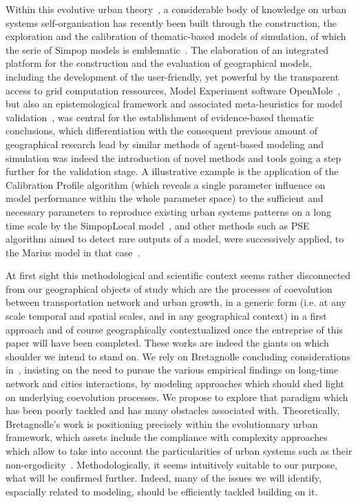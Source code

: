 

Within this evolutive urban theory~\cite{pumain2006evolutionary}, a considerable body of knowledge on urban systems self-organisation has recently been built through the construction, the exploration and the calibration of thematic-based models of simulation, of which the serie of Simpop models is emblematic~\cite{pumain2012multi}. The elaboration of an integrated platform for the construction and the evaluation of geographical models, including the development of the user-friendly, yet powerful by the transparent access to grid computation ressources, Model Experiment software OpenMole~\cite{reuillon2013openmole}, but also an epistemological framework and associated meta-heuristics for model validation~\cite{rey2015plateforme}, was central for the establishment of evidence-based thematic conclusions, which differentiation with the consequent previous amount of geographical research lead by similar methods of agent-based modeling and simulation was indeed the introduction of novel methods and tools going a step further for the validation stage. A illustrative example is the application of the Calibration Profile algorithm (which reveals a single parameter influence on model performance within the whole parameter space) to the sufficient and necessary parameters to reproduce existing urban systems patterns on a long time scale by the SimpopLocal model~\cite{schmitt2014half}, and other methods such as PSE algorithm aimed to detect rare outputs of a model, were successively applied, to the Marius model in that case~\cite{10.1371/journal.pone.0138212}.

At first sight this methodological and scientific context seems rather disconnected from our geographical objects of study which are the processes of coevolution between transportation network and urban growth, in a generic form (i.e. at any scale temporal and spatial scales, and in any geographical context) in a first approach and of course geographically contextualized once the entreprise of this paper will have been completed. These works are indeed the giants on which shoulder we intend to stand on. We rely on Bretagnolle concluding considerations in~\cite{bretagnolle:tel-00459720}, insisting on the need to pursue the various empirical findings on long-time network and cities interactions, by modeling approaches which should shed light on underlying coevolution processes. We propose to explore that paradigm which has been poorly tackled and has many obstacles associated with. Theoretically, Bretagnolle's work is positioning precisely within the evolutionnary urban framework, which assets include the compliance with complexity approaches which allow to take into account the particularities of urban systems such as their non-ergodicity~\cite{pumain2012urban}. Methodologically, it seems intuitively suitable to our purpose, what will be confirmed further. Indeed, many of the issues we will identify, espacially related to modeling, should be efficiently tackled building on it.



